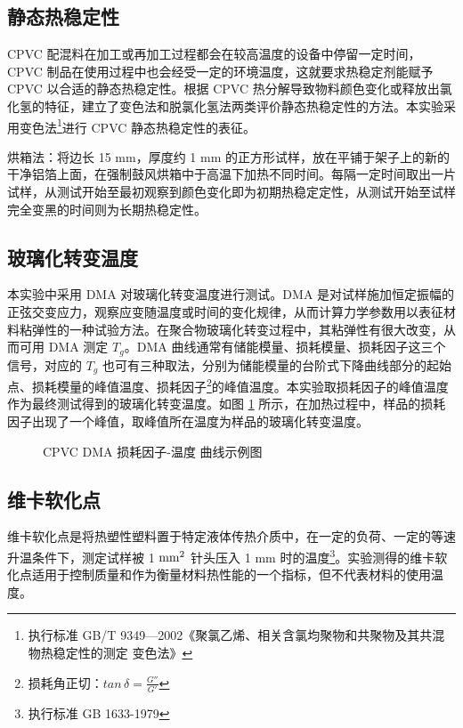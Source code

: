 \subsection{静态热稳定性}
CPVC 配混料在加工或再加工过程都会在较高温度的设备中停留一定时间，CPVC 制品在使用过程中也会经受一定的环境温度，这就要求热稳定剂能赋予 CPVC 以合适的静态热稳定性。根据 CPVC 热分解导致物料颜色变化或释放出氯化氢的特征，建立了变色法和脱氯化氢法两类评价静态热稳定性的方法。本实验采用变色法\footnote{执行标准 GB/T 9349—2002《聚氯乙烯、相关含氯均聚物和共聚物及其共混物热稳定性的测定 变色法》}进行 CPVC 静态热稳定性的表征。\par
烘箱法：将边长 15 mm，厚度约 1 mm 的正方形试样，放在平铺于架子上的新的干净铝箔上面，在强制鼓风烘箱中于高温下加热不同时间。每隔一定时间取出一片试样，从测试开始至最初观察到颜色变化即为初期热稳定定性，从测试开始至试样完全变黑的时间则为长期热稳定性。

\subsection{玻璃化转变温度}
本实验中采用 DMA 对玻璃化转变温度进行测试。DMA 是对试样施加恒定振幅的正弦交变应力，观察应变随温度或时间的变化规律，从而计算力学参数用以表征材料粘弹性的一种试验方法。在聚合物玻璃化转变过程中，其粘弹性有很大改变，从而可用 DMA 测定 $T_g$。DMA 曲线通常有储能模量、损耗模量、损耗因子这三个信号，对应的 $T_g$ 也可有三种取法，分别为储能模量的台阶式下降曲线部分的起始点、损耗模量的峰值温度、损耗因子\footnote{损耗角正切：$tan \, \delta = \frac{G''}{G'}$}的峰值温度。本实验取损耗因子的峰值温度作为最终测试得到的玻璃化转变温度。如图 \ref{figExTg} 所示，在加热过程中，样品的损耗因子出现了一个峰值，取峰值所在温度为样品的玻璃化转变温度。

\begin{figure}[!htbp]
    \begin{center}
        
    \end{center}
    \caption{CPVC DMA 损耗因子-温度 曲线示例图}
    \label{figExTg}
\end{figure}

\subsection{维卡软化点}
维卡软化点是将热塑性塑料置于特定液体传热介质中，在一定的负荷、一定的等速升温条件下，测定试样被 1 $\rm{mm^2}$ 针头压入 1 mm 时的温度\footnote{执行标准 GB 1633-1979}。实验测得的维卡软化点适用于控制质量和作为衡量材料热性能的一个指标，但不代表材料的使用温度。


